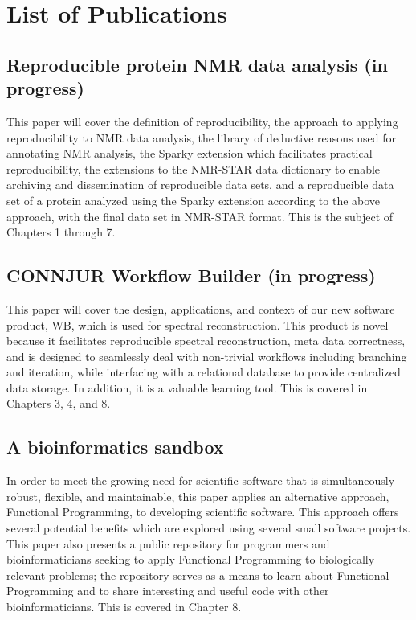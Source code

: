 \chapter{List of Publications}

\section{Reproducible protein NMR data analysis (in progress)}
This paper will cover the definition of reproducibility, the approach to
applying reproducibility to NMR data analysis, the library of deductive
reasons used for annotating NMR analysis, the Sparky extension which 
facilitates practical reproducibility, the extensions to the NMR-STAR
data dictionary to enable archiving and dissemination of reproducible
data sets, and a reproducible data set of a protein analyzed using the Sparky
extension according to the above approach, with the final data set in 
NMR-STAR format.  This is the subject of Chapters 1 through 7.


\section{CONNJUR Workflow Builder (in progress)}
This paper \cite{connjur-wb} will cover the design, applications, and context
of our new software product, WB, which is used for
spectral reconstruction.  This product is novel because it facilitates 
reproducible spectral reconstruction, meta data correctness, and is designed
to seamlessly deal with non-trivial workflows including branching and 
iteration, while interfacing with a relational database to provide centralized
data storage.  In addition, it is a valuable learning tool.  This is covered
in Chapters 3, 4, and 8.


\section{A bioinformatics sandbox}
In order to meet the growing need for scientific software that is 
simultaneously robust, flexible, and maintainable, this paper 
\cite{fenwick2012} applies an alternative approach, Functional Programming,
to developing scientific software.  This approach offers several potential
benefits which are explored using several small software projects. 
This paper also presents a public repository for programmers and bioinformaticians 
seeking to apply Functional Programming to biologically relevant problems; the
repository serves as a means to learn about Functional Programming and to share
interesting and useful code with other bioinformaticians.
This is covered in Chapter 8.


